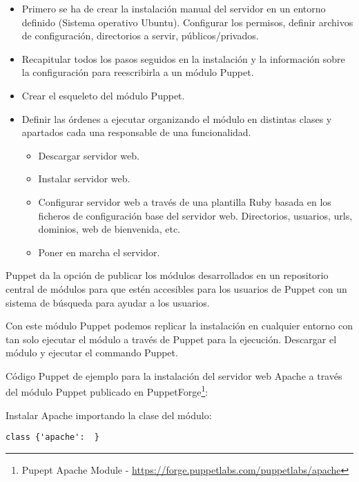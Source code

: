 \begin{itemize}
	\item Primero se ha de crear la instalación manual del servidor en un entorno definido (Sistema operativo Ubuntu). Configurar los permisos, definir archivos de configuración, directorios a servir, públicos/privados.
	\item Recapitular todos los pasos seguidos en la instalación y la información sobre la configuración para reescribirla a un módulo Puppet.
	\item Crear el esqueleto del módulo Puppet.
	\item Definir las órdenes a ejecutar organizando el módulo en distintas clases y apartados cada una responsable de una funcionalidad.
	\begin{itemize}
	    \item Descargar servidor web.
	    \item Instalar servidor web.
	    \item Configurar servidor web a través de una plantilla Ruby basada en los ficheros de configuración base del servidor web. Directorios, usuarios, urls, dominios, web de bienvenida, etc.
	    \item Poner en marcha el servidor.
    \end{itemize}
\end{itemize}

\par Puppet da la opción de publicar los módulos desarrollados en un repositorio central de módulos para que estén accesibles para los usuarios de Puppet con un sistema de búsqueda para ayudar a los usuarios.

\par Con este módulo Puppet podemos replicar la instalación en cualquier entorno con tan solo ejecutar el módulo a través de Puppet para la ejecución. Descargar el módulo y ejecutar el commando Puppet.

\par Código Puppet de ejemplo para la instalación del servidor web Apache a través del módulo Puppet publicado en PuppetForge\footnote{Pupept Apache Module - \url{https://forge.puppetlabs.com/puppetlabs/apache}}:

\par Instalar Apache importando la clase del módulo:

\lstset{style=rubybasico}
\begin{lstlisting}[frame=trbl]
class {'apache':  }
\end{lstlisting}

